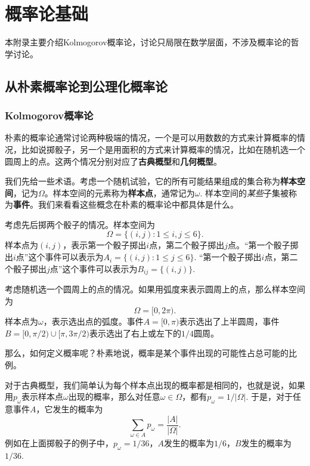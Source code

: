 \chapter{概率论基础}\label{chap:prob}

本附录主要介绍Kolmogorov概率论，讨论只局限在数学层面，不涉及概率论的哲学讨论。

\section{从朴素概率论到公理化概率论}

\subsection{Kolmogorov概率论}
朴素的概率论通常讨论两种极端的情况，一个是可以用数数的方式来计算概率的情况，比如说掷骰子，另一个是用面积的方式来计算概率的情况，比如在随机选一个圆周上的点。这两个情况分别对应了\textbf{古典概型}和\textbf{几何概型}。

我们先给一些术语。考虑一个随机试验，它的所有可能结果组成的集合称为\textbf{样本空间}，记为$\Omega$。样本空间的元素称为\textbf{样本点}，通常记为$\omega$. 样本空间的\emph{某些}子集被称为\textbf{事件}。我们来看看这些概念在朴素的概率论中都具体是什么。

\begin{example}[古典概型]
考虑先后掷两个骰子的情况。样本空间为
\[
    \Omega = \{ (i, j): 1 \leq i, j \leq 6 \}.
\]
样本点为$(i, j)$，表示第一个骰子掷出$i$点，第二个骰子掷出$j$点。“第一个骰子掷出$i$点”这个事件可以表示为$A_i = \{ (i, j): 1 \leq j \leq 6 \}$. “第一个骰子掷出$i$点，第二个骰子掷出$j$点”这个事件可以表示为$B_{ij} = \{ (i, j) \}$.
\end{example}

\begin{example}[几何概型]
考虑随机选一个圆周上的点的情况。如果用弧度来表示圆周上的点，那么样本空间为
\[
    \Omega = [0, 2\pi).
\]
样本点为$\omega$，表示选出点的弧度。事件$A = [0, \pi)$表示选出了上半圆周，事件$B = [0, \pi/2)\cup[\pi, 3\pi/2)$表示选出了右上或左下的$1/4$圆周。
\end{example}

那么，如何定义概率呢？朴素地说，概率是某个事件出现的可能性占总可能的比例。

对于古典概型，我们简单认为每个样本点出现的概率都是相同的，也就是说，如果用$p_\omega$表示样本点$\omega$出现的概率，那么对任意$\omega\in\Omega$，都有$p_\omega = 1/|\Omega|$. 于是，对于任意事件$A$，它发生的概率为
\[
    \sum_{\omega\in A} p_\omega = \frac{|A|}{|\Omega|}.
\]
例如在上面掷骰子的例子中，$p_\omega=1/36$，$A$发生的概率为$1/6$，$B$发生的概率为$1/36$.

